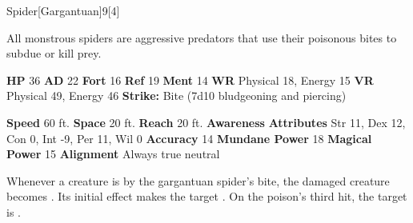   \begin{monsection}{Spider}[Gargantuan]{9}[4]
    \vspace{-1em}\vspace{-1em}
    \vspace{0em}

    
    All monstrous spiders are aggressive predators that use their poisonous bites to subdue or kill prey.
  
    

    \begin{spellcontent}
      \begin{spelltargetinginfo}
        \pari \textbf{HP} 36 \monsep
          \textbf{AD} 22 \monsep
          \textbf{Fort} 16 \monsep
          \textbf{Ref} 19 \monsep
          \textbf{Ment} 14
        \pari \textbf{WR} Physical 18, Energy 15 \monsep
        \textbf{VR} Physical 49, Energy 46
        \pari \textbf{Strike:}
            Bite  (7d10 bludgeoning and piercing)
      \end{spelltargetinginfo}
    \end{spellcontent}
    \begin{monsterfooter}
      \pari \textbf{Speed} 60 ft. \monsep
        \textbf{Space} 20 ft. \monsep
        \textbf{Reach} 20 ft.
      \pari \textbf{Awareness} 
      \pari \textbf{Attributes}
        Str 11, Dex 12,
        Con 0, Int -9,
        Per 11, Wil 0
      \pari \textbf{Accuracy} 14 \monsep
        \textbf{Mundane Power} 18 \monsep
      \textbf{Magical Power} 15
      \pari \textbf{Alignment} Always true neutral
    \end{monsterfooter}
  \end{monsection}
    Whenever a creature is  by the gargantuan spider's bite,
      the damaged creature becomes .
    Its initial effect makes the target .
    On the poison's third hit, the target is .
  

